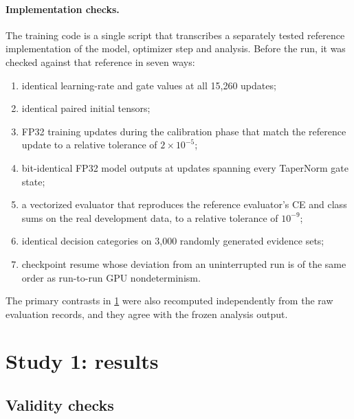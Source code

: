 \documentclass[11pt]{article}
\begin{document}
\paragraph{Implementation checks.} The training code is a single script that transcribes a separately tested
reference implementation of the model, optimizer step and analysis. Before the run, it was checked against that
reference in seven ways:
\begin{enumerate}[label=(\roman*),leftmargin=1.8em,itemsep=1pt]
  \item identical learning-rate and gate values at all 15{,}260 updates;
  \item identical paired initial tensors;
  \item FP32 training updates during the calibration phase that match the reference update to a relative
        tolerance of $2\times10^{-5}$;
  \item bit-identical FP32 model outputs at updates spanning every TaperNorm gate state;
  \item a vectorized evaluator that reproduces the reference evaluator's CE and class sums on the real
        development data, to a relative tolerance of $10^{-9}$;
  \item identical decision categories on 3{,}000 randomly generated evidence sets;
  \item checkpoint resume whose deviation from an uninterrupted run is of the same order as run-to-run GPU
        nondeterminism.
\end{enumerate}
The primary contrasts in \cref{sec:results} were also recomputed independently from the raw evaluation records,
and they agree with the frozen analysis output.

\section{Study 1: results}
\label{sec:results}

\subsection{Validity checks}
\end{document}

